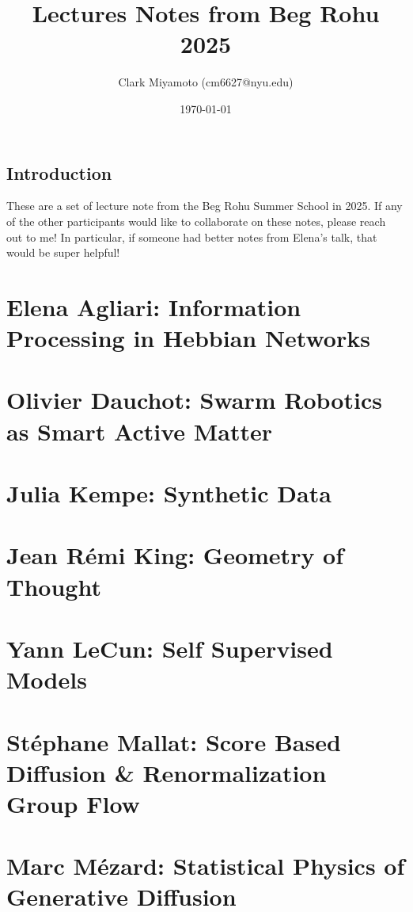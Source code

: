 \documentclass[12pt,fleqn]{book}
\title{Lectures Notes from Beg Rohu 2025}
\author{Clark Miyamoto (cm6627@nyu.edu)}
\date{\today}
\numberwithin{equation}{section} %
\begin{document}
\maketitle
\section{Introduction}
These are a set of lecture note from the Beg Rohu Summer School in 2025. If any of the other participants would like to collaborate on these notes, please reach out to me! In particular, if someone had better notes from Elena's talk, that would be super helpful!


\tableofcontents
\newpage

\chapter{Elena Agliari: Information Processing in Hebbian Networks}

\newpage

\chapter{Olivier Dauchot: Swarm Robotics as Smart Active Matter}

\newpage

\chapter{Julia Kempe: Synthetic Data}

\newpage

\chapter{Jean R\'emi King: Geometry of Thought}

\newpage

\chapter{Yann LeCun: Self Supervised Models}

\newpage

\chapter{St\'ephane Mallat: Score Based Diffusion \& Renormalization Group Flow}

\newpage

\chapter{Marc M\'ezard: Statistical Physics of Generative Diffusion}

\newpage
\end{document}
